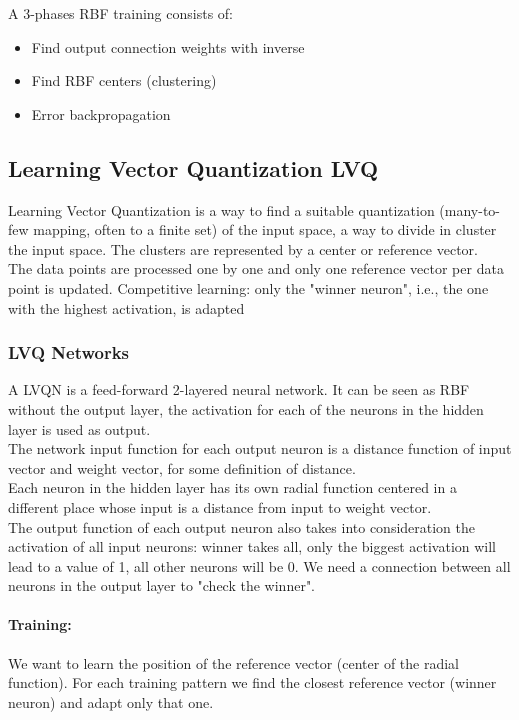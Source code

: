 A 3-phases RBF training consists of: 
\begin{itemize}
	\item Find output connection weights with inverse
	\item Find RBF centers (clustering)
	\item Error backpropagation
\end{itemize}

\subsection{Learning Vector Quantization LVQ}

Learning Vector Quantization is a way to find a suitable quantization (many-to-few mapping, often to a finite set) of the input space, a way to divide in cluster the input space. The clusters are represented by a center or reference vector.\\

The data points are processed one by one and only one reference vector per data point is updated. Competitive learning: only the "winner neuron", i.e., the one with the highest activation, is adapted

\subsubsection{LVQ Networks}
A LVQN is a feed-forward 2-layered neural network. It can be seen as RBF without the output layer, the activation for each of the neurons in the hidden layer is used as output.\\

The network input function for each output neuron is a distance function of input vector and weight vector, for some definition of distance.\\
Each neuron in the hidden layer has its own radial function centered in a different place whose input is a distance from input to weight vector.\\

The output function of each output neuron also takes into consideration the activation of all input neurons: winner takes all, only the biggest activation will lead to a value of 1, all other neurons will be 0. We need a connection between all neurons in the output layer to "check the winner".\\

\paragraph{Training:} We want to learn the position of the reference vector (center of the radial function). For each training pattern we find the closest reference vector (winner neuron) and adapt only that one. \\

